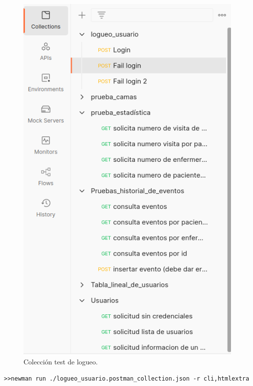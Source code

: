 \begin{figure}[ht]
	\centering
	\includegraphics[scale=.35]{./Figures/Postman.png}
	\caption{Colección test de logueo.}
	\label{fig:Colección logueo usuario en Postman}
\end{figure}

\begin{lstlisting}[label=cod:Newman,caption=  Ejecución de Newman en consola.]
>>newman run ./logueo_usuario.postman_collection.json -r cli,htmlextra
\end{lstlisting}

